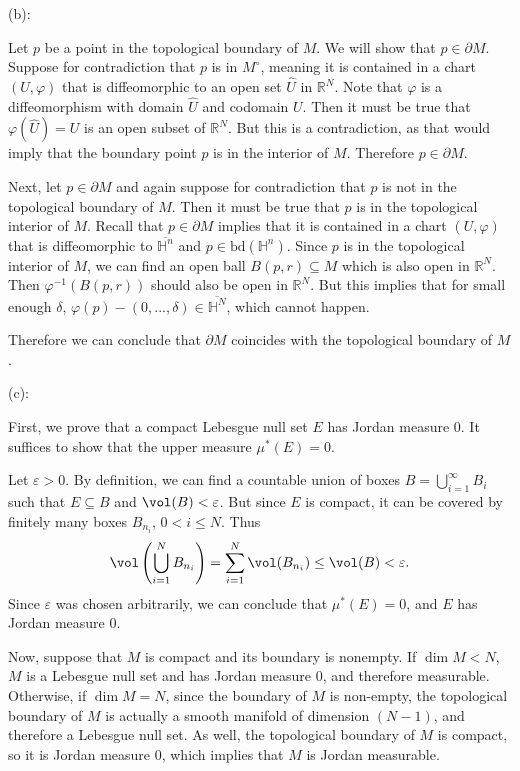\documentclass{../../../tex-setup/eh-homework}
\begin{document}
\begin{question}{42}
        \medskip

        (b):

        Let \(p\) be a point in the topological boundary of \(M\). We will show that \(p \in \partial M\). Suppose for contradiction that \(p\) is in \(M^\circ\), meaning it is contained in a chart \((U, \varphi)\) that is diffeomorphic to an open set \(\hat{U}\) in \(\mathbb{R}^N\). Note that \(\varphi\) is a diffeomorphism with domain \(\hat{U}\) and codomain \(U\). Then it must be true that \(\varphi (\hat{U}) = U\) is an open subset of \(\mathbb{R}^N\). But this is a contradiction, as that would imply that the boundary point \(p\) is in the interior of \(M\). Therefore \(p \in \partial M\).

        Next, let \(p \in \partial M\) and again suppose for contradiction that \(p\) is not in the topological boundary of \(M\). Then it must be true that \(p\) is in the topological interior of \(M\). Recall that \(p \in \partial M\) implies that it is contained in a chart \((U, \varphi)\) that is diffeomorphic to \(\overline{\mathbb{H}^n}\) and \(p \in \mathrm{bd} (\mathbb{H}^n)\). Since \(p\) is in the topological interior of \(M\), we can find an open ball \(B(p, r) \subseteq M\) which is also open in \(\mathbb{R}^N\). Then \(\varphi ^{-1}(B(p,r))\) should also be open in \(\mathbb{R}^N\). But this implies that for small enough \(\delta\), \(\varphi (p) - (0, ..., \delta) \in \overline{\mathbb{H}^N}\), which cannot happen.

        \smallskip

        Therefore we can conclude that \(\partial M\) coincides with the topological boundary of \(M\).

        \medskip

        (c):

        First, we prove that a compact Lebesgue null set \(E\) has Jordan measure 0. It suffices to show that the upper measure \(\mu ^* (E) = 0\).

        Let \(\varepsilon > 0\). By definition, we can find a countable union of boxes \(B = \bigcup_{i=1}^{\infty} B_i\) such that \(E \subseteq B\) and \(\vol(B) < \varepsilon\). But since \(E\) is compact, it can be covered by finitely many boxes \(B_{n_i}\), \(0 < i \leq N\). Thus
        \[
            \vol\left( \bigcup_{i=1}^{N} B_{n_i} \right) = \sum_{i=1}^{N} \vol(B_{n_i}) \leq \vol(B) < \varepsilon.
        \]
        Since \(\varepsilon\) was chosen arbitrarily, we can conclude that \(\mu ^* (E) = 0\), and \(E\) has Jordan measure 0.

        Now, suppose that \(M\) is compact and its boundary is nonempty. If \(\dim M < N\), \(M\) is a Lebesgue null set and has Jordan measure 0, and therefore measurable. Otherwise, if \(\dim M = N\), since the boundary of \(M\) is non-empty, the topological boundary of \(M\) is actually a smooth manifold of dimension \((N-1)\), and therefore a Lebesgue null set. As well, the topological boundary of \(M\) is compact, so it is Jordan measure 0, which implies that \(M\) is Jordan measurable.
    \end{question}
\end{document}
